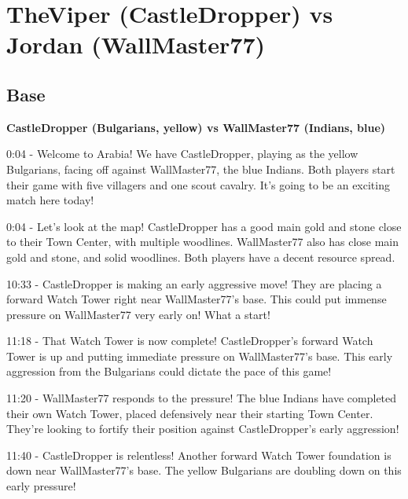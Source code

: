 \section{TheViper (CastleDropper) vs Jordan (WallMaster77)}
\label{appendix:viper-jordan}
\subsection{Base}
\textbf{CastleDropper (Bulgarians, yellow) vs WallMaster77 (Indians, blue)}

0:04 - Welcome to Arabia! We have CastleDropper, playing as the yellow Bulgarians, facing off against WallMaster77, the blue Indians. Both players start their game with five villagers and one scout cavalry. It's going to be an exciting match here today! \par \vspace{1em}

0:04 - Let's look at the map! CastleDropper has a good main gold and stone close to their Town Center, with multiple woodlines. WallMaster77 also has close main gold and stone, and solid woodlines. Both players have a decent resource spread. \par \vspace{1em}

10:33 - CastleDropper is making an early aggressive move! They are placing a forward Watch Tower right near WallMaster77's base. This could put immense pressure on WallMaster77 very early on! What a start! \par \vspace{1em}

11:18 - That Watch Tower is now complete! CastleDropper's forward Watch Tower is up and putting immediate pressure on WallMaster77's base. This early aggression from the Bulgarians could dictate the pace of this game! \par \vspace{1em}

11:20 - WallMaster77 responds to the pressure! The blue Indians have completed their own Watch Tower, placed defensively near their starting Town Center. They're looking to fortify their position against CastleDropper's early aggression! \par \vspace{1em}

11:40 - CastleDropper is relentless! Another forward Watch Tower foundation is down near WallMaster77's base. The yellow Bulgarians are doubling down on this early pressure! \par \vspace{1em}


